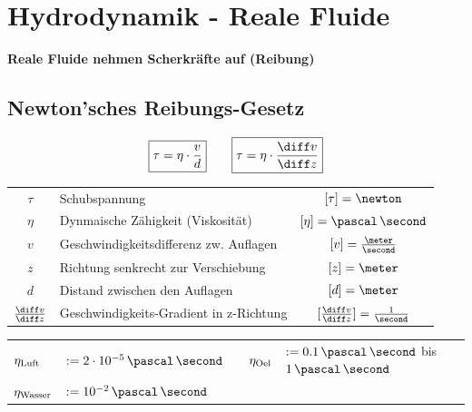 \section{Hydrodynamik - Reale Fluide}

\textbf{Reale Fluide nehmen Scherkräfte auf (Reibung)}

\subsection{Newton'sches Reibungs-Gesetz}

\vspace{-0.2cm}

\[\boxed{ \tau = \eta \cdot \frac{v}{d} }  \qquad  \boxed{ \tau = \eta \cdot \frac{\diff v}{\diff z} } \]

\renewcommand{\arraystretch}{1.3}
\begin{tabular}{c l c}
    $\tau$                      & Schubspannung                             & $[\tau] = \newton$                                \\
    $\eta$                      & Dynmaische Zähigkeit (Viskosität)         & $[\eta] = \pascal \, \second$                     \\
    $v$                         & Geschwindigkeitsdifferenz zw. Auflagen    & $[v] = \frac{\meter}{\second}$                    \\
    $z$                         & Richtung senkrecht zur Verschiebung       & $[z] = \meter$                                    \\
    $d$                         & Distand zwischen den Auflagen             & $[d] = \meter$                                    \\
    $\frac{\diff v}{\diff z}$   & Geschwindigkeits-Gradient in z-Richtung   & $[\frac{\diff v}{\diff z}] = \frac{1}{\second}$ 
\end{tabular}
\renewcommand{\arraystretch}{1}

\medskip



\renewcommand{\arraystretch}{1.5}
\begin{tabular}{ll c|c ll}
    $\eta_{\rm Luft}$   & $:= 2 \cdot 10^{-5} \, \pascal \, \second$    & &  $\eta_{\rm Oel}$   & $:= 0.1 \, \pascal \, \second$ \; bis \; $1 \, \pascal \, \second$ \\
    $\eta_{\rm Wasser}$ & $:= 10^{-2} \, \pascal \, \second$            & & \\
\end{tabular}
\renewcommand{\arraystretch}{1}

